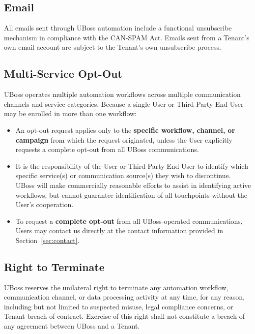 \documentclass[11pt, letterpaper]{article}
\begin{document}
\subsection{Email}

All emails sent through UBoss automation include a functional unsubscribe mechanism in
compliance with the CAN-SPAM Act. Emails sent from a Tenant's own email account are
subject to the Tenant's own unsubscribe process.

\subsection{Multi-Service Opt-Out}

UBoss operates multiple automation workflows across multiple communication channels and
service categories. Because a single User or Third-Party End-User may be enrolled in
more than one workflow:

\begin{itemize}
    \item An opt-out request applies only to the \textbf{specific workflow, channel, or
          campaign} from which the request originated, unless the User explicitly
          requests a complete opt-out from all UBoss communications.

    \item It is the responsibility of the User or Third-Party End-User to identify which
          specific service(s) or communication source(s) they wish to discontinue.
          UBoss will make commercially reasonable efforts to assist in identifying active
          workflows, but cannot guarantee identification of all touchpoints without the
          User's cooperation.

    \item To request a \textbf{complete opt-out} from all UBoss-operated communications,
          Users may contact us directly at the contact information provided in
          Section~\ref{sec:contact}.
\end{itemize}

\subsection{Right to Terminate}

UBoss reserves the unilateral right to terminate any automation workflow, communication
channel, or data processing activity at any time, for any reason, including but not
limited to suspected misuse, legal compliance concerns, or Tenant breach of contract.
Exercise of this right shall not constitute a breach of any agreement between UBoss
and a Tenant.
\end{document}
